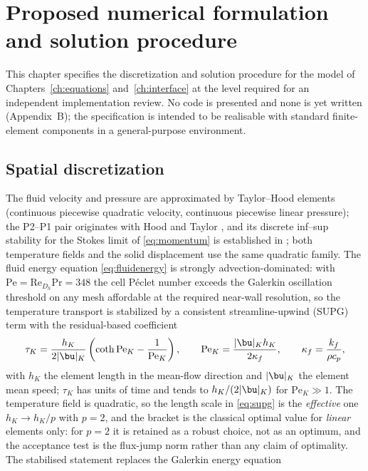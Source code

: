 \chapter{Proposed numerical formulation and solution procedure}
\label{ch:numerics}

This chapter specifies the discretization and solution procedure for the model of
Chapters~\ref{ch:equations} and~\ref{ch:interface} at the level required for an independent
implementation review. No code is presented and none is yet written (Appendix~B); the specification
is intended to be realisable with standard finite-element components in a general-purpose
environment.

\section{Spatial discretization}
The fluid velocity and pressure are approximated by Taylor--Hood elements (continuous piecewise
quadratic velocity, continuous piecewise linear pressure); the P2--P1 pair originates with Hood and
Taylor \cite{hood1974navier}, and its discrete inf--sup stability for the Stokes limit of
\eqref{eq:momentum} is established in \cite{brezzi1991mixed}; both
temperature fields and the solid displacement use the same quadratic family. The fluid energy
equation \eqref{eq:fluidenergy} is strongly advection-dominated: with
$\mathrm{Pe}=\mathrm{Re}_{D_h}\mathrm{Pr}=348$ the cell P\'eclet number exceeds the Galerkin
oscillation threshold on any mesh affordable at the required near-wall resolution, so the
temperature transport is stabilized by a consistent streamline-upwind (SUPG) term with the
residual-based coefficient
\begin{equation}
\tau_K=\frac{h_K}{2|\bu|_K}\left(\coth\mathrm{Pe}_K-\frac{1}{\mathrm{Pe}_K}\right),
\qquad
\mathrm{Pe}_K=\frac{|\bu|_K h_K}{2\kappa_f},
\qquad \kappa_f=\frac{k_f}{\rho c_p},
\label{eq:supg}
\end{equation}
with $h_K$ the element length in the mean-flow direction and $|\bu|_K$ the element mean speed; $\tau_K$
has units of time and tends to $h_K/(2|\bu|_K)$ for $\mathrm{Pe}_K\gg1$. The temperature field is
quadratic, so the length scale in \eqref{eq:supg} is the \emph{effective} one $h_K\to h_K/p$ with
$p=2$, and the bracket is the classical optimal value for \emph{linear} elements only: for $p=2$ it
is retained as a robust choice, not as an optimum, and the acceptance test is the flux-jump norm
rather than any claim of optimality. The stabilised statement replaces the Galerkin energy equation
